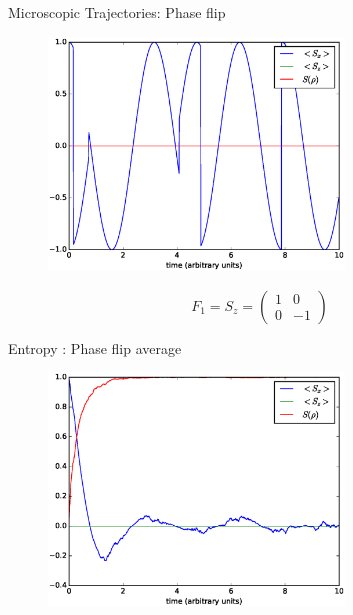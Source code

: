 \documentclass{beamer}
\begin{document}
\begin{frame}{Microscopic Trajectories: Phase flip}
	\begin{figure}[h]
		\centering
		\includegraphics[width=0.7\textwidth]{figs/phase_flip_1.eps}
	\end{figure}
	\begin{equation*}
	F_1 = S_z =
	\begin{pmatrix}
	1 & 0 \\
	0 & -1 
	\end{pmatrix}
	\end{equation*}
\end{frame}

\begin{frame}{Entropy :  Phase flip average}
	\begin{figure}[h]
		\centering
		\includegraphics[width=0.7\textwidth]{figs/phase_flip_1000.eps}
	\end{figure}
\end{frame}
\end{document}
